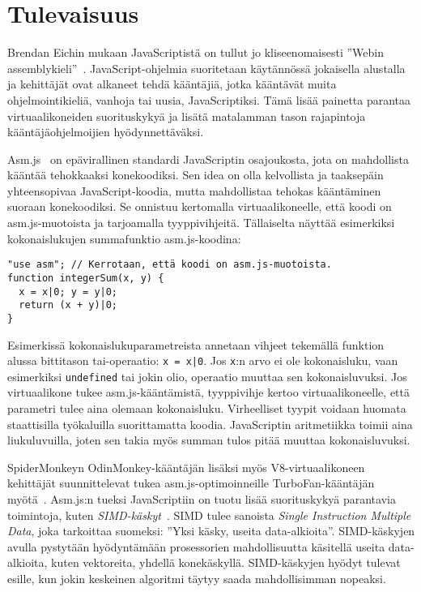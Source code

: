 \section{Tulevaisuus}

Brendan Eichin mukaan JavaScriptistä on tullut jo kliseenomaisesti ''Webin assemblykieli''~\cite{webassembly}. JavaScript-ohjelmia suoritetaan käytännössä jokaisella alustalla ja kehittäjät ovat alkaneet tehdä kääntäjiä, jotka kääntävät muita ohjelmointikieliä, vanhoja tai uusia, JavaScriptiksi. Tämä lisää painetta parantaa virtuaalikoneiden suorituskykyä ja lisätä matalamman tason rajapintoja kääntäjäohjelmoijien hyödynnettäväksi.

Asm.js~\cite{asmjs} on epävirallinen standardi JavaScriptin osajoukosta, jota on mahdollista kääntää tehokkaaksi konekoodiksi. Sen idea on olla kelvollista ja taaksepäin yhteensopivaa JavaScript-koodia, mutta mahdollistaa tehokas kääntäminen suoraan konekoodiksi. Se onnistuu kertomalla virtuaalikoneelle, että koodi on asm.js-muotoista ja tarjoamalla tyyppivihjeitä. Tällaiselta näyttää esimerkiksi kokonaislukujen summafunktio asm.js-koodina:
\begin{lstlisting}
"use asm"; // Kerrotaan, että koodi on asm.js-muotoista.
function integerSum(x, y) {
  x = x|0; y = y|0;
  return (x + y)|0;
}
\end{lstlisting}
Esimerkissä kokonaislukuparametreista annetaan vihjeet tekemällä funktion alussa bittitason tai-operaatio: \texttt{x = x|0}. Jos \texttt{x}:n arvo ei ole kokonaisluku, vaan esimerkiksi \texttt{undefined} tai jokin olio, operaatio muuttaa sen kokonaisluvuksi. Jos virtuaalikone tukee asm.js-kääntämistä, tyyppivihje kertoo virtuaalikoneelle, että parametri tulee aina olemaan kokonaisluku. Virheelliset tyypit voidaan huomata staattisilla työkaluilla suorittamatta koodia. JavaScriptin aritmetiikka toimii aina liukuluvuilla, joten sen takia myös summan tulos pitää muuttaa kokonaisluvuksi.

SpiderMonkeyn OdinMonkey-kääntäjän lisäksi myös V8-virtuaalikoneen kehittäjät suunnittelevat tukea asm.js-optimoinneille TurboFan-kääntäjän myötä~\cite{turbofan}. Asm.js:n tueksi JavaScriptiin on tuotu lisää suorituskykyä parantavia toimintoja, kuten \textit{SIMD-käskyt}~\cite{webassembly}. SIMD tulee sanoista \textit{Single Instruction Multiple Data}, joka tarkoittaa suomeksi: ''Yksi käsky, useita data-alkioita''. SIMD-käskyjen avulla pystytään hyödyntämään prosessorien mahdollisuutta käsitellä useita data-alkioita, kuten vektoreita, yhdellä konekäskyllä. SIMD-käskyjen hyödyt tulevat esille, kun jokin keskeinen algoritmi täytyy saada mahdollisimman nopeaksi.

